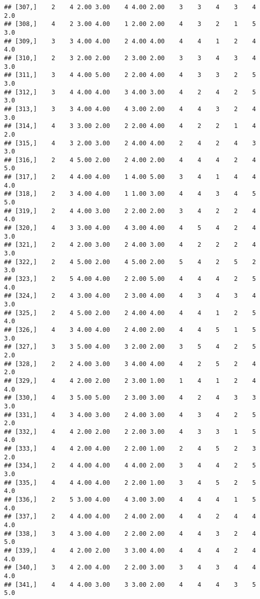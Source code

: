 \documentclass[]{article}
\begin{document}
\begin{verbatim}
## [307,]    2    4 2.00 3.00    4 4.00 2.00    3    3    4    3    4  2.0
## [308,]    4    2 3.00 4.00    1 2.00 2.00    4    3    2    1    5  3.0
## [309,]    3    3 4.00 4.00    2 4.00 4.00    4    4    1    2    4  4.0
## [310,]    2    3 2.00 2.00    2 3.00 2.00    3    3    4    3    4  3.0
## [311,]    3    4 4.00 5.00    2 2.00 4.00    4    3    3    2    5  3.0
## [312,]    3    4 4.00 4.00    3 4.00 3.00    4    2    4    2    5  3.0
## [313,]    3    3 4.00 4.00    4 3.00 2.00    4    4    3    2    4  3.0
## [314,]    4    3 3.00 2.00    2 2.00 4.00    4    2    2    1    4  2.0
## [315,]    4    3 2.00 3.00    2 4.00 4.00    2    4    2    4    3  3.0
## [316,]    2    4 5.00 2.00    2 4.00 2.00    4    4    4    2    4  5.0
## [317,]    2    4 4.00 4.00    1 4.00 5.00    3    4    1    4    4  4.0
## [318,]    2    3 4.00 4.00    1 1.00 3.00    4    4    3    4    5  5.0
## [319,]    2    4 4.00 3.00    2 2.00 2.00    3    4    2    2    4  4.0
## [320,]    4    3 3.00 4.00    4 3.00 4.00    4    5    4    2    4  3.0
## [321,]    2    4 2.00 3.00    2 4.00 3.00    4    2    2    2    4  3.0
## [322,]    2    4 5.00 2.00    4 5.00 2.00    5    4    2    5    2  3.0
## [323,]    2    5 4.00 4.00    2 2.00 5.00    4    4    4    2    5  4.0
## [324,]    2    4 3.00 4.00    2 3.00 4.00    4    3    4    3    4  3.0
## [325,]    2    4 5.00 2.00    2 4.00 4.00    4    4    1    2    5  4.0
## [326,]    4    3 4.00 4.00    2 4.00 2.00    4    4    5    1    5  3.0
## [327,]    3    3 5.00 4.00    3 2.00 2.00    3    5    4    2    5  2.0
## [328,]    2    2 4.00 3.00    3 4.00 4.00    4    2    5    2    4  2.0
## [329,]    4    4 2.00 2.00    2 3.00 1.00    1    4    1    2    4  4.0
## [330,]    4    3 5.00 5.00    2 3.00 3.00    4    2    4    3    3  3.0
## [331,]    4    3 4.00 3.00    2 4.00 3.00    4    3    4    2    5  2.0
## [332,]    4    4 2.00 2.00    2 2.00 3.00    4    3    3    1    5  4.0
## [333,]    4    4 2.00 4.00    2 2.00 1.00    2    4    5    2    3  2.0
## [334,]    2    4 4.00 4.00    4 4.00 2.00    3    4    4    2    5  3.0
## [335,]    4    4 4.00 4.00    2 2.00 1.00    3    4    5    2    5  4.0
## [336,]    2    5 3.00 4.00    4 3.00 3.00    4    4    4    1    5  4.0
## [337,]    2    4 4.00 4.00    2 4.00 2.00    4    4    2    4    4  4.0
## [338,]    3    4 3.00 4.00    2 2.00 2.00    4    4    3    2    4  5.0
## [339,]    4    4 2.00 2.00    3 3.00 4.00    4    4    4    2    4  4.0
## [340,]    3    4 2.00 4.00    2 2.00 3.00    3    4    3    4    4  4.0
## [341,]    4    4 4.00 3.00    3 3.00 2.00    4    4    4    3    5  5.0

\end{verbatim}
\end{document}
